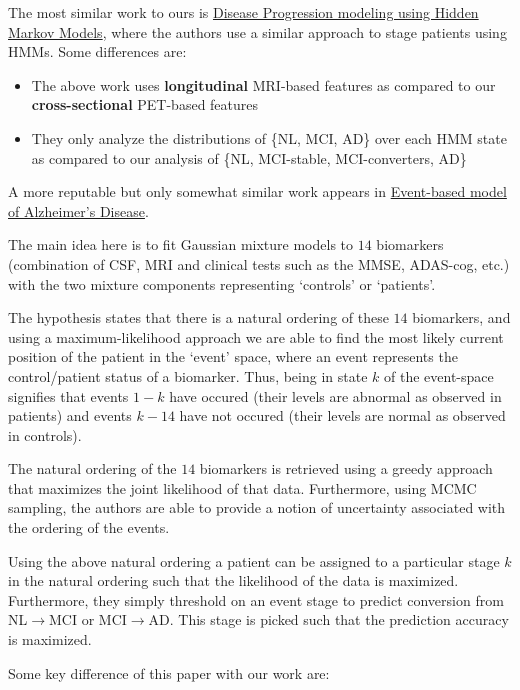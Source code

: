 \documentclass[12pt,a4paper]{article}
\begin{document}
The most similar work to ours is
\href{http://ieeexplore.ieee.org/xpls/abs_all.jsp?arnumber=6346556\&tag=1}{Disease
  Progression modeling using Hidden Markov Models}, where the authors
use a similar approach to stage patients using HMMs. Some differences
are:

\begin{itemize}
\item The above work uses \textbf{longitudinal} MRI-based features as
  compared to our \textbf{cross-sectional} PET-based features
\item They only analyze the distributions of \{NL, MCI, AD\} over each
  HMM state as compared to our analysis of \{NL, MCI-stable,
    MCI-converters, AD\}
\end{itemize}

A more reputable but only somewhat similar work appears in
\href{http://brain.oxfordjournals.org/content/early/2014/07/09/brain.awu176.full}{Event-based
  model of Alzheimer's Disease}.

The main idea here is to fit Gaussian mixture models to $14$
biomarkers (combination of CSF, MRI and clinical tests such as the
MMSE, ADAS-cog, etc.) with the two mixture components representing
`controls' or `patients'. 

The hypothesis states that there is a
natural ordering of these $14$ biomarkers, and using a
maximum-likelihood approach we are able to find the most likely
current position of the patient in the `event' space, where an event
represents the control/patient status of a biomarker. Thus, being in
state $k$ of the event-space signifies that events $1-k$ have occured
(their levels are abnormal as observed in patients)  and events $k-14$
have not occured (their levels are normal as observed in controls). 

The natural ordering of the $14$ biomarkers is retrieved using a
greedy approach that maximizes the joint likelihood of that
data. Furthermore, using MCMC sampling, the authors are able to
provide a notion of uncertainty associated with the ordering of the
events.

Using the above natural ordering a patient can be assigned to a
particular stage $k$ in the natural ordering such that the likelihood
of the data is maximized. Furthermore, they simply threshold on an
event stage to predict conversion from NL$\rightarrow$MCI or
MCI$\rightarrow$AD. This stage is picked such that the prediction
accuracy is maximized.

Some key difference of this paper with our work are:
\end{document}
